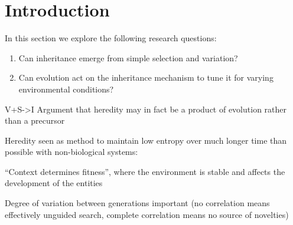 





\chapter{Introduction}

In this section we explore the following research questions:

\vspace{0.3cm}
\begin{minipage}[l]{0.95\textwidth}
	\begin{enumerate}[label=RQ\arabic*:]
		\item Can inheritance emerge from simple selection and variation?
		\item Can evolution act on the inheritance mechanism to tune it for varying environmental conditions?
	\end{enumerate}
\end{minipage}
\vspace{0.3cm}

V+S-\textgreater{}I
Argument that heredity may in fact be a product of evolution rather than a precursor \autocite{Bourrat2015}

Heredity seen as method to maintain low entropy over much longer time than possible with non-biological systems: 
	
``Context determines fitness'', where the environment is stable and affects the development of the entities

Degree of variation between generations important (no correlation means effectively unguided search, complete correlation means no source of novelties)

